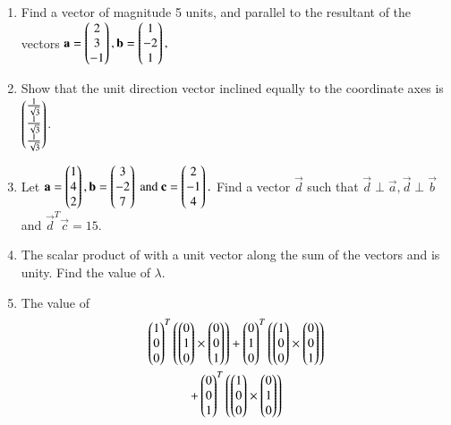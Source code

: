 \begin{enumerate}[label=\arabic*.,ref=\thesubsection.\theenumi]
\item Find a vector of magnitude 5 units, and parallel to the resultant of the vectors 
$
\mathbf{a}=\begin{pmatrix}2\\3\\-1\end{pmatrix},
\mathbf{b}=\begin{pmatrix}1\\-2\\1\end{pmatrix},
$
\item Show that the unit direction vector inclined equally to the coordinate axes is $\begin{pmatrix}\frac{1}{\sqrt{3}}\\\frac{1}{\sqrt{3}}\\ \frac{1}{\sqrt{3}}\end{pmatrix}$.
\item Let 
$
\mathbf{a}=\begin{pmatrix}1\\4\\2\end{pmatrix},
\mathbf{b}=\begin{pmatrix}3\\-2\\7\end{pmatrix} \text{ and }
\mathbf{c}=\begin{pmatrix}2\\-1\\4\end{pmatrix}.
$
Find a vector $\vec{d}$ such that $\vec{d}\perp\vec{a},\vec{d}\perp\vec{b}$ and $\vec{d}^T\vec{c} = 15$.
\\
\solution 

\item The scalar product of  with a unit vector along the sum  of the vectors  and  is unity.  Find the value of $\lambda$.
\item The value of 
\begin{multline}
\myvec{1\\0\\0}^T\brak{\myvec{0\\1\\0}\times \myvec{0\\0\\1}}
+\myvec{0\\1\\0}^T\brak{\myvec{1\\0\\0}\times \myvec{0\\0\\1}}
\\
+\myvec{0\\0\\1}^T\brak{\myvec{1\\0\\0}\times \myvec{0\\1\\0}}

\end{multline}
\end{enumerate}
